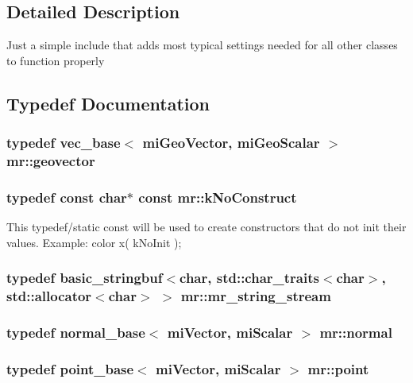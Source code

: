 \subsection{Detailed Description}
Just a simple include that adds most typical settings needed for all other classes to function properly 



\subsection{Typedef Documentation}
\subsubsection{\setlength{\rightskip}{0pt plus 5cm}typedef {\bf vec\_\-base}$<$ mi\-Geo\-Vector, mi\-Geo\-Scalar $>$ {\bf mr::geovector}}\label{namespacemr_a15}


\subsubsection{\setlength{\rightskip}{0pt plus 5cm}typedef const char$\ast$ const {\bf mr::k\-No\-Construct}}\label{namespacemr_a0}


This typedef/static const will be used to create constructors that do not init their values. Example: color x( k\-No\-Init ); 
\subsubsection{\setlength{\rightskip}{0pt plus 5cm}typedef basic\_\-stringbuf$<$char, std::char\_\-traits$<$char$>$, std::allocator$<$char$>$ $>$ {\bf mr::mr\_\-string\_\-stream}}\label{namespacemr_a4}


\subsubsection{\setlength{\rightskip}{0pt plus 5cm}typedef {\bf normal\_\-base}$<$ mi\-Vector, mi\-Scalar $>$ {\bf mr::normal}}\label{namespacemr_a11}


\subsubsection{\setlength{\rightskip}{0pt plus 5cm}typedef {\bf point\_\-base}$<$ mi\-Vector, mi\-Scalar $>$ {\bf mr::point}}\label{namespacemr_a12}


